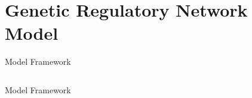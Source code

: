 \section{Genetic Regulatory Network Model}

\begin{frame}{Model Framework}
\begin{columns}
\begin{column}{0.5\textwidth}

\end{column}

\begin{column}{0.5\textwidth}

\end{column}

\end{columns}
\end{frame}

\begin{frame}{Model Framework}

\end{frame}




